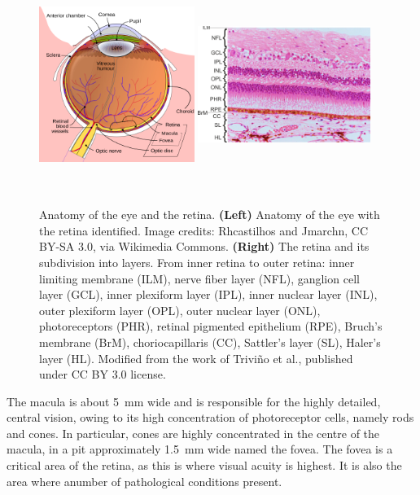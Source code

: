\documentclass[12pt,a4paper]{journal}
\begin{document}
\begin{figure}[hb]
  \centering
  \includegraphics[width=0.45\textwidth, height=7cm]{ArchitectureEye} %
  \hfill
  \includegraphics[width=0.5\textwidth, height=7cm]{RetinalLayers}
  \caption{Anatomy of the eye and the retina. \textbf{(Left)} Anatomy of the eye with the retina identified. Image credits: Rhcastilhos and Jmarchn, CC BY-SA 3.0, via Wikimedia Commons. \textbf{(Right)} The retina and its subdivision into layers. From inner retina to outer retina: inner limiting membrane (ILM), nerve fiber layer (NFL), ganglion cell layer (GCL), inner plexiform layer (IPL), inner nuclear layer (INL), outer plexiform layer (OPL), outer nuclear layer (ONL), photoreceptors (PHR), retinal pigmented epithelium (RPE), Bruch's membrane (BrM), choriocapillaris (CC), Sattler's layer (SL), Haler's layer (HL). Modified from the work of Trivi\~no et al., published under CC BY 3.0 license.~\cite{Trivino_2012}}
  \label{fig:architecture-eye}
\end{figure}

The macula is about \SI{5}{\mm} wide and is responsible for the highly detailed, central vision, owing to its high concentration of photoreceptor cells, namely rods and cones.
In particular, cones are highly concentrated in the centre of the macula, in a pit approximately \SI{1.5}{\mm} wide named the fovea.
The fovea is a critical area of the retina, as this is where visual acuity is highest. It is also the area where anumber of pathological conditions present.
\end{document}
